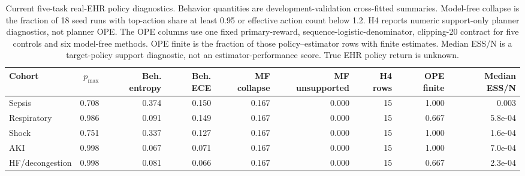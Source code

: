 \begin{table}[p]
\centering
\caption{Current five-task real-EHR policy diagnostics. Behavior quantities are development-validation cross-fitted summaries. Model-free collapse is the fraction of 18 seed runs with top-action share at least 0.95 or effective action count below 1.2. H4 reports numeric support-only planner diagnostics, not planner OPE. The OPE columns use one fixed primary-reward, sequence-logistic-denominator, clipping-20 contract for five controls and six model-free methods. OPE finite is the fraction of those policy--estimator rows with finite estimates. Median ESS/N is a target-policy support diagnostic, not an estimator-performance score. True EHR policy return is unknown.}
\label{tab:current-ehr-policy-diagnostics}
\scriptsize
\setlength{\tabcolsep}{4.0pt}
\begin{tabular}{lrrrrrrrr}
\toprule
Cohort & $p_{\max}$ & Beh. entropy & Beh. ECE & MF collapse & MF unsupported & H4 rows & OPE finite & Median ESS/N \\
\midrule
Sepsis & 0.708 & 0.374 & 0.150 & 0.167 & 0.000 & 15 & 1.000 & 0.003 \\
Respiratory & 0.986 & 0.091 & 0.149 & 0.167 & 0.000 & 15 & 0.667 & 5.8e-04 \\
Shock & 0.751 & 0.337 & 0.127 & 0.167 & 0.000 & 15 & 1.000 & 1.6e-04 \\
AKI & 0.998 & 0.067 & 0.071 & 0.167 & 0.000 & 15 & 1.000 & 7.0e-04 \\
HF/decongestion & 0.998 & 0.081 & 0.066 & 0.167 & 0.000 & 15 & 0.667 & 2.3e-04 \\
\bottomrule
\end{tabular}
\end{table}
